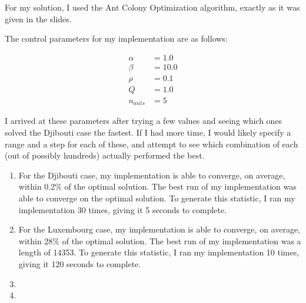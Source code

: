 \documentclass{article}
\begin{document}
For my solution, I used the Ant Colony Optimization algorithm, exactly as it
was given in the slides.

The control parameters for my implementation are as follows:

\begin{align*}
    \alpha &= 1.0\\
    \beta &= 10.0\\
    \rho &= 0.1\\
    Q &= 1.0\\
    n_{ants} &= 5
\end{align*}

I arrived at these parameters after trying a few values and seeing which ones
solved the Djibouti case the fastest. If I had more time, I would likely specify
a range and a step for each of these, and attempt to see which combination of
each (out of possibly hundreds) actually performed the best.

\begin{enumerate}

\item{} %

For the Djibouti case, my implementation is able to converge, on average, within
0.2\% of the optimal solution. The best run of my implementation was able to
converge on the optimal solution. To generate this statistic, I ran my
implementation 30 times, giving it 5 seconds to complete.

\item{} %

For the Luxembourg case, my implementation is able to converge, on average,
within 28\% of the optimal solution. The best run of my implementation was
a length of 14353. To generate this statistic, I ran my implementation 10 times,
giving it 120 seconds to complete.

\item{} %

\item{} %

\end{enumerate}
\end{document}
